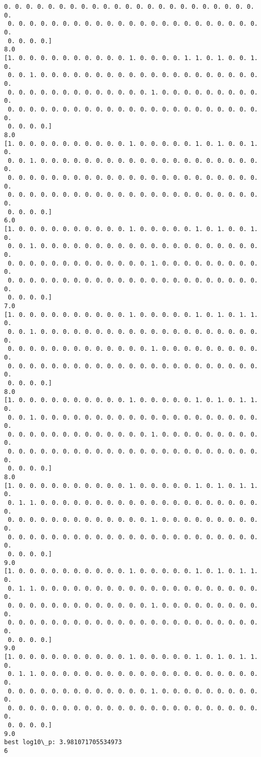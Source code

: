 \documentclass[11pt]{article}
\begin{document}
\begin{Verbatim}[commandchars=\\\{\}]
 0. 0. 0. 0. 0. 0. 0. 0. 0. 0. 0. 0. 0. 0. 0. 0. 0. 0. 0. 0. 0. 0. 0. 0.
 0. 0. 0. 0. 0. 0. 0. 0. 0. 0. 0. 0. 0. 0. 0. 0. 0. 0. 0. 0. 0. 0. 0. 0.
 0. 0. 0. 0.]
8.0
[1. 0. 0. 0. 0. 0. 0. 0. 0. 0. 0. 1. 0. 0. 0. 0. 1. 1. 0. 1. 0. 0. 1. 0.
 0. 0. 1. 0. 0. 0. 0. 0. 0. 0. 0. 0. 0. 0. 0. 0. 0. 0. 0. 0. 0. 0. 0. 0.
 0. 0. 0. 0. 0. 0. 0. 0. 0. 0. 0. 0. 0. 1. 0. 0. 0. 0. 0. 0. 0. 0. 0. 0.
 0. 0. 0. 0. 0. 0. 0. 0. 0. 0. 0. 0. 0. 0. 0. 0. 0. 0. 0. 0. 0. 0. 0. 0.
 0. 0. 0. 0.]
8.0
[1. 0. 0. 0. 0. 0. 0. 0. 0. 0. 0. 1. 0. 0. 0. 0. 0. 1. 0. 1. 0. 0. 1. 0.
 0. 0. 1. 0. 0. 0. 0. 0. 0. 0. 0. 0. 0. 0. 0. 0. 0. 0. 0. 0. 0. 0. 0. 0.
 0. 0. 0. 0. 0. 0. 0. 0. 0. 0. 0. 0. 0. 0. 0. 0. 0. 0. 0. 0. 0. 0. 0. 0.
 0. 0. 0. 0. 0. 0. 0. 0. 0. 0. 0. 0. 0. 0. 0. 0. 0. 0. 0. 0. 0. 0. 0. 0.
 0. 0. 0. 0.]
6.0
[1. 0. 0. 0. 0. 0. 0. 0. 0. 0. 0. 1. 0. 0. 0. 0. 0. 1. 0. 1. 0. 0. 1. 0.
 0. 0. 1. 0. 0. 0. 0. 0. 0. 0. 0. 0. 0. 0. 0. 0. 0. 0. 0. 0. 0. 0. 0. 0.
 0. 0. 0. 0. 0. 0. 0. 0. 0. 0. 0. 0. 0. 1. 0. 0. 0. 0. 0. 0. 0. 0. 0. 0.
 0. 0. 0. 0. 0. 0. 0. 0. 0. 0. 0. 0. 0. 0. 0. 0. 0. 0. 0. 0. 0. 0. 0. 0.
 0. 0. 0. 0.]
7.0
[1. 0. 0. 0. 0. 0. 0. 0. 0. 0. 0. 1. 0. 0. 0. 0. 0. 1. 0. 1. 0. 1. 1. 0.
 0. 0. 1. 0. 0. 0. 0. 0. 0. 0. 0. 0. 0. 0. 0. 0. 0. 0. 0. 0. 0. 0. 0. 0.
 0. 0. 0. 0. 0. 0. 0. 0. 0. 0. 0. 0. 0. 1. 0. 0. 0. 0. 0. 0. 0. 0. 0. 0.
 0. 0. 0. 0. 0. 0. 0. 0. 0. 0. 0. 0. 0. 0. 0. 0. 0. 0. 0. 0. 0. 0. 0. 0.
 0. 0. 0. 0.]
8.0
[1. 0. 0. 0. 0. 0. 0. 0. 0. 0. 0. 1. 0. 0. 0. 0. 0. 1. 0. 1. 0. 1. 1. 0.
 0. 0. 1. 0. 0. 0. 0. 0. 0. 0. 0. 0. 0. 0. 0. 0. 0. 0. 0. 0. 0. 0. 0. 0.
 0. 0. 0. 0. 0. 0. 0. 0. 0. 0. 0. 0. 0. 1. 0. 0. 0. 0. 0. 0. 0. 0. 0. 0.
 0. 0. 0. 0. 0. 0. 0. 0. 0. 0. 0. 0. 0. 0. 0. 0. 0. 0. 0. 0. 0. 0. 0. 0.
 0. 0. 0. 0.]
8.0
[1. 0. 0. 0. 0. 0. 0. 0. 0. 0. 0. 1. 0. 0. 0. 0. 0. 1. 0. 1. 0. 1. 1. 0.
 0. 1. 1. 0. 0. 0. 0. 0. 0. 0. 0. 0. 0. 0. 0. 0. 0. 0. 0. 0. 0. 0. 0. 0.
 0. 0. 0. 0. 0. 0. 0. 0. 0. 0. 0. 0. 0. 1. 0. 0. 0. 0. 0. 0. 0. 0. 0. 0.
 0. 0. 0. 0. 0. 0. 0. 0. 0. 0. 0. 0. 0. 0. 0. 0. 0. 0. 0. 0. 0. 0. 0. 0.
 0. 0. 0. 0.]
9.0
[1. 0. 0. 0. 0. 0. 0. 0. 0. 0. 0. 1. 0. 0. 0. 0. 0. 1. 0. 1. 0. 1. 1. 0.
 0. 1. 1. 0. 0. 0. 0. 0. 0. 0. 0. 0. 0. 0. 0. 0. 0. 0. 0. 0. 0. 0. 0. 0.
 0. 0. 0. 0. 0. 0. 0. 0. 0. 0. 0. 0. 0. 1. 0. 0. 0. 0. 0. 0. 0. 0. 0. 0.
 0. 0. 0. 0. 0. 0. 0. 0. 0. 0. 0. 0. 0. 0. 0. 0. 0. 0. 0. 0. 0. 0. 0. 0.
 0. 0. 0. 0.]
9.0
[1. 0. 0. 0. 0. 0. 0. 0. 0. 0. 0. 1. 0. 0. 0. 0. 0. 1. 0. 1. 0. 1. 1. 0.
 0. 1. 1. 0. 0. 0. 0. 0. 0. 0. 0. 0. 0. 0. 0. 0. 0. 0. 0. 0. 0. 0. 0. 0.
 0. 0. 0. 0. 0. 0. 0. 0. 0. 0. 0. 0. 0. 1. 0. 0. 0. 0. 0. 0. 0. 0. 0. 0.
 0. 0. 0. 0. 0. 0. 0. 0. 0. 0. 0. 0. 0. 0. 0. 0. 0. 0. 0. 0. 0. 0. 0. 0.
 0. 0. 0. 0.]
9.0
best log10\_p: 3.981071705534973
6

    \end{Verbatim}
\end{document}
